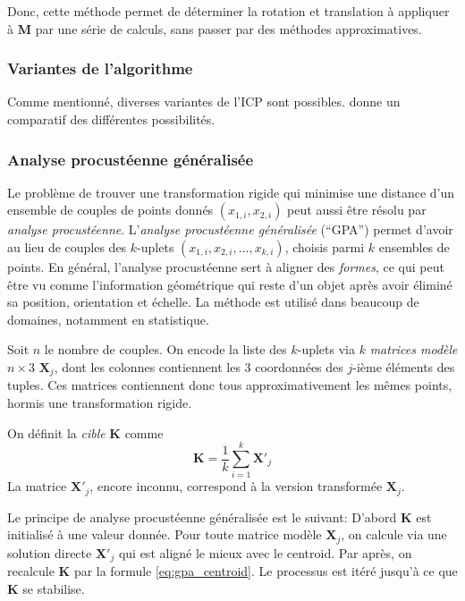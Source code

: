 \documentclass[a4paper,10pt]{scrreprt}
\begin{document}
Donc, cette méthode permet de déterminer la rotation et translation à appliquer à \textbf{M} par une série de calculs, sans passer par des méthodes approximatives.


\subsubsection{Variantes de l'algorithme}
Comme mentionné, diverses variantes de l'ICP sont possibles. \cite{Rusi2001} donne un comparatif des différentes possibilités.

\subsubsection{Analyse procustéenne généralisée}
Le problème de trouver une transformation rigide qui minimise une distance d'un ensemble de couples de points donnés ${(x_{1,i}, x_{2,i})}$ peut aussi être résolu par \emph{analyse procustéenne}. L'\emph{analyse procustéenne généralisée} (``GPA'') permet d'avoir au lieu de couples des $k$-uplets ${(x_{1,i}, x_{2,i}, \ldots, x_{k,i})}$, choisis parmi $k$ ensembles de points. En général, l'analyse procustéenne sert à aligner des \emph{formes}, ce qui peut être vu comme l'information géométrique qui reste d'un objet après avoir éliminé sa position, orientation et échelle. La méthode est utilisé dans beaucoup de domaines, notamment en statistique.

Soit $n$ le nombre de couples. On encode la liste des $k$-uplets via $k$ \emph{matrices modèle} $n \times 3$ $\mathbf{X}_j$, dont les colonnes contiennent les $3$ coordonnées des $j$-ième éléments des tuples. Ces matrices contiennent donc tous approximativement les mêmes points, hormis une transformation rigide.

On définit la \emph{cible} $\mathbf{K}$ comme
\begin{equation} \label{eq:gpa_centroid}
	\mathbf{K} = \frac{1}{k} \sum_{i=1}^{k} \mathbf{X'}_j 
\end{equation}
La matrice $\mathbf{X'}_j$, encore inconnu, correspond à la version transformée $\mathbf{X}_j$.

Le principe de analyse procustéenne généralisée est le suivant: D'abord $\mathbf{K}$ est initialisé à une valeur donnée. Pour toute matrice modèle $\mathbf{X}_j$, on calcule via une solution directe $\mathbf{X'}_j$ qui est aligné le mieux avec le centroid. Par après, on recalcule $\mathbf{K}$ par la formule \ref{eq:gpa_centroid}. Le processus est itéré jusqu'à ce que $\mathbf{K}$ se stabilise. \cite{Told2010}
\end{document}
